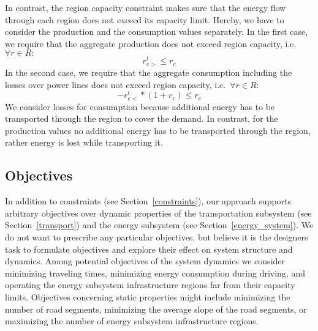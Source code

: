 In contrast, the region capacity constraint makes sure that the energy flow through each region does not exceed its capacity limit. Hereby, we have to consider the production and the consumption values separately. In the first case, we require that the aggregate production does not exceed region capacity, i.e.\ $\forall r \in R:$
\[
	r_{e>}^t \leq r_c
\]
In the second case, we require that the aggregate consumption including the losses over power lines does not exceed region capacity, i.e.\ $\forall r \in R:$
\[
	- r_{e<}^t * (1 + r_e) \leq r_c
\]
We consider losses for consumption because additional energy has to be transported through the region to cover the demand. In contrast, for the production values no additional energy has to be transported through the region, rather energy is lost while transporting it.

\subsection{Objectives}
\label{objectives}
In addition to constraints (see Section~\ref{constraints}), our approach supports arbitrary objectives over dynamic properties of the transportation subsystem (see Section~\ref{transport}) and the energy subsystem (see Section~\ref{energy_system}). We do not want to prescribe any particular objectives, but believe it is the designers task to formulate objectives and explore their effect on system structure and dynamics. Among potential objectives of the system dynamics we consider minimizing traveling times, minimizing energy consumption during driving, and operating the energy subsystem infrastructure regions far from their capacity limits. 
Objectives concerning static properties might include minimizing the number of road segments, minimizing the average slope of the road segments, or maximizing the number of energy subsystem infrastructure regions.
